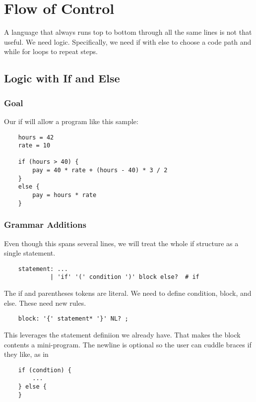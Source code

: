 \chapter{Flow of Control}

A language that always runs top to bottom through all the same lines
is not that useful. We need logic. Specifically, we need if with
else to choose a code path and while for loops to repeat steps.

\section{Logic with If and Else}

\subsection{Goal}

Our if will allow a program like this sample:

{\footnotesize
\begin{verbatim}
    hours = 42
    rate = 10

    if (hours > 40) {
        pay = 40 * rate + (hours - 40) * 3 / 2
    }
    else {
        pay = hours * rate
    }
\end{verbatim}
}

\subsection{Grammar Additions}

Even though this spans several lines, we will treat the whole if structure
as a single statement.

{\footnotesize
\begin{verbatim}
    statement: ...
             | 'if' '(' condition ')' block else?  # if
\end{verbatim}
}

The if and parentheses tokens are literal. We need to define
condition, block, and else. These need new rules.

{\footnotesize
\begin{verbatim}
    block: '{' statement* '}' NL? ;
\end{verbatim}
}

This leverages the statement definiion we already have. That makes
the block contents a mini-program. The newline is optional so the
user can cuddle braces if they like, as in

{\footnotesize
\begin{verbatim}
    if (condtion) {
        ...
    } else {
    }
\end{verbatim}
}


